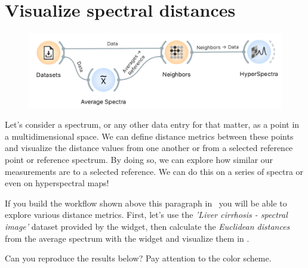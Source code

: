 \chapter{Visualize spectral distances}
\label{ch:visualize-spectral-distances}

\begin{figure}
	\vspace{-1.5 cm}
    \includegraphics[scale=0.6]{graphics/ch-visualize_spectral_distances/ch-visualize_spectral_distances-fig1.png}
\end{figure}

Let's consider a spectrum, or any other data entry for that matter, as a point in a multidimensional space. We can define distance metrics between these points and visualize the distance values from one another or from a selected reference point or reference spectrum. By doing so, we can explore how similar our measurements are to a selected reference. We can do this on a series of spectra or even on hyperspectral maps!

If you build the workflow shown above this paragraph in \mutation\ you will be able to explore various distance metrics. First, let's use the \textit{'Liver cirrhosis - spectral image'} dataset provided by the  widget, then calculate the \textit{Euclidean distances} from the average spectrum with the  widget and visualize them in . 

\medskip
Can you reproduce the results below? Pay attention to the color scheme.


